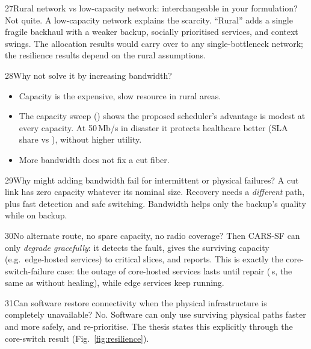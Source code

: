 \begin{qa}{27}{Rural network vs low-capacity network: interchangeable in your formulation?}
Not quite. A low-capacity network explains the scarcity. ``Rural'' adds a single fragile backhaul with a weaker backup,
socially prioritised services, and context swings. The allocation results would carry over to any single-bottleneck
network; the resilience results depend on the rural assumptions.
\end{qa}

\begin{qa}{28}{Why not solve it by increasing bandwidth?}
\begin{itemize}
\item Capacity is the expensive, slow resource in rural areas.
\item The capacity sweep () shows the proposed scheduler's advantage is modest at every capacity.
At 50\,Mb/s in disaster it protects healthcare better (SLA share \NSensCapDisasterProposedFiveZeroHcSla{} vs
\NSensCapDisasterStaticFiveZeroHcSla), without higher utility.
\item More bandwidth does not fix a cut fiber.
\end{itemize}
\end{qa}

\begin{qa}{29}{Why might adding bandwidth fail for intermittent or physical failures?}
A cut link has zero capacity whatever its nominal size. Recovery needs a \emph{different} path, plus fast
detection and safe switching. Bandwidth helps only the backup's quality while on backup.
\end{qa}

\begin{qa}{30}{No alternate route, no spare capacity, no radio coverage?}
Then CARS-SF can only \emph{degrade gracefully}: it detects the fault, gives the surviving capacity (e.g.\ edge-hosted
services) to critical slices, and reports. This is exactly the core-switch-failure case: the outage of core-hosted
services lasts until repair (\NOutCoreFullMean\,s, the same as without healing), while edge services keep running.
\end{qa}

\begin{qa}{31}{Can software restore connectivity when the physical infrastructure is completely unavailable?}
No. Software can only use surviving physical paths faster and more safely, and re-prioritise. The thesis states
this explicitly through the core-switch result (Fig.~\ref{fig:resilience}).
\end{qa}

